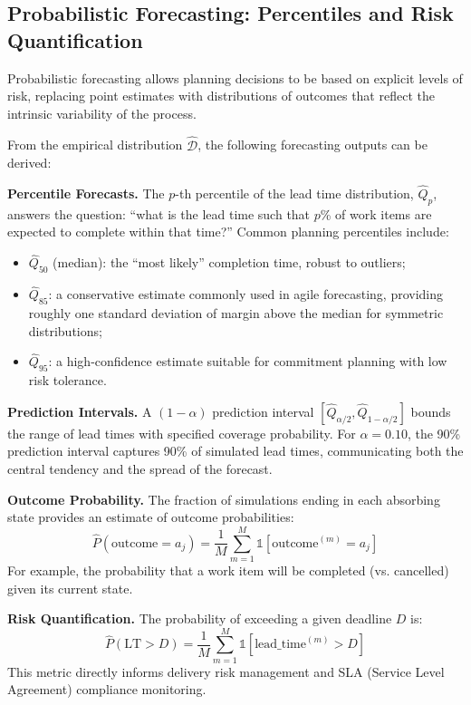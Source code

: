 \subsection{Probabilistic Forecasting: Percentiles and Risk Quantification}
\label{sec:mc-forecasting}
Probabilistic forecasting allows planning decisions to be based on explicit levels of risk, replacing point estimates with distributions of outcomes that reflect the intrinsic variability of the process.

From the empirical distribution $\hat{\mathcal{D}}$, the following
forecasting outputs can be derived:

\textbf{Percentile Forecasts.} The $p$-th percentile of the lead time
distribution, $\hat{Q}_p$, answers the question: ``what is the lead time
such that $p$\% of work items are expected to complete within that time?''
Common planning percentiles include:

\begin{itemize}
    \item $\hat{Q}_{50}$ (median): the ``most likely'' completion time,
    robust to outliers;
    \item $\hat{Q}_{85}$: a conservative estimate commonly used in agile
    forecasting, providing roughly one standard deviation of margin above
    the median for symmetric distributions;
    \item $\hat{Q}_{95}$: a high-confidence estimate suitable for
    commitment planning with low risk tolerance.
\end{itemize}

\textbf{Prediction Intervals.} A $(1-\alpha)$ prediction interval
$[\hat{Q}_{\alpha/2}, \hat{Q}_{1-\alpha/2}]$ bounds the range of lead
times with specified coverage probability. For $\alpha = 0.10$, the 90\%
prediction interval captures 90\% of simulated lead times, communicating
both the central tendency and the spread of the forecast.

\textbf{Outcome Probability.} The fraction of simulations ending in
each absorbing state provides an estimate of outcome probabilities:
\begin{equation}
\label{eq:mc-outcome-prob}
\hat{P}(\text{outcome} = a_j) = \frac{1}{M}
\sum_{m=1}^{M} \mathbb{1}[\text{outcome}^{(m)} = a_j]
\end{equation}
For example, the probability that a work item will be completed (vs.
cancelled) given its current state.

\textbf{Risk Quantification.} The probability of exceeding a given
deadline $D$ is:
\begin{equation}
\label{eq:mc-risk}
\hat{P}(\text{LT} > D) = \frac{1}{M}
\sum_{m=1}^{M} \mathbb{1}[\text{lead\_time}^{(m)} > D]
\end{equation}
This metric directly informs delivery risk management and SLA
(Service Level Agreement) compliance monitoring.


